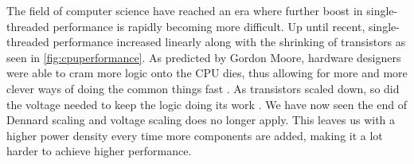 The field of computer science have reached an era where further boost in
single-threaded performance is rapidly becoming more difficult. Up until recent,
single-threaded performance increased linearly along with the shrinking of transistors as
seen in \autoref{fig:cpuperformance}.
As predicted by Gordon Moore, hardware designers were able to cram more logic
onto the CPU dies, thus allowing for more and more clever ways of doing the
common things fast \cite{moore1965cramming}. As transistors scaled down, so did
the voltage needed to keep the logic doing its work \cite{dennard1974design}. We
have now seen the end of Dennard scaling \cite{esmaeilzadeh2011dark} and voltage scaling
does no longer apply. This leaves us with a higher power density every time
more components are added, making it a lot harder to achieve higher performance.

%
%
%
%


